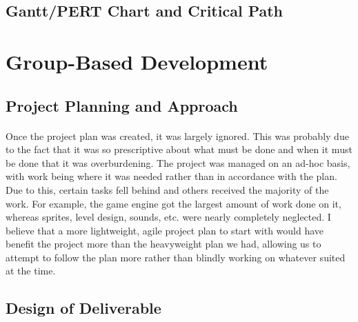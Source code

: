 \documentclass{article}
\begin{document}
\subsection{Gantt/PERT Chart and Critical Path}

\section {Group-Based Development}
\subsection {Project Planning and Approach}
\paragraph{}
Once the project plan was created, it was largely ignored. This was probably due to the fact that it was so prescriptive about what must be done and when it must be done that it was overburdening. The project was managed on an ad-hoc basis, with work being where it was needed rather than in accordance with the plan. Due to this, certain tasks fell behind and others received the majority of the work. For example, the game engine got the largest amount of work done on it, whereas sprites, level design, sounds, etc. were nearly completely neglected. I believe that a more lightweight, agile project plan to start with would have benefit the project more than the heavyweight plan we had, allowing us to attempt to follow the plan more rather than blindly working on whatever suited at the time.
\subsection {Design of Deliverable}
\end{document}
